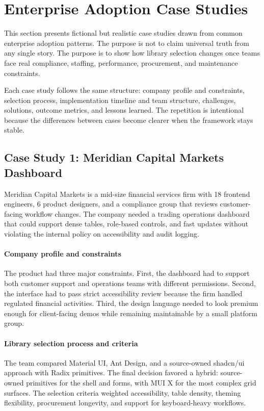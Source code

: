 \clearpage
\section{Enterprise Adoption Case Studies}

This section presents fictional but realistic case studies drawn from common enterprise adoption patterns. The purpose is not to claim universal truth from any single story. The purpose is to show how library selection changes once teams face real compliance, staffing, performance, procurement, and maintenance constraints.

Each case study follows the same structure: company profile and constraints, selection process, implementation timeline and team structure, challenges, solutions, outcome metrics, and lessons learned. The repetition is intentional because the differences between cases become clearer when the framework stays stable.

\subsection{Case Study 1: Meridian Capital Markets Dashboard}
Meridian Capital Markets is a mid-size financial services firm with 18 frontend engineers, 6 product designers, and a compliance group that reviews customer-facing workflow changes. The company needed a trading operations dashboard that could support dense tables, role-based controls, and fast updates without violating the internal policy on accessibility and audit logging.

\paragraph{Company profile and constraints}
The product had three major constraints. First, the dashboard had to support both customer support and operations teams with different permissions. Second, the interface had to pass strict accessibility review because the firm handled regulated financial activities. Third, the design language needed to look premium enough for client-facing demos while remaining maintainable by a small platform group.

\paragraph{Library selection process and criteria}
The team compared Material UI, Ant Design, and a source-owned shadcn/ui approach with Radix primitives. The final decision favored a hybrid: source-owned primitives for the shell and forms, with MUI X for the most complex grid surfaces. The selection criteria weighted accessibility, table density, theming flexibility, procurement longevity, and support for keyboard-heavy workflows.

